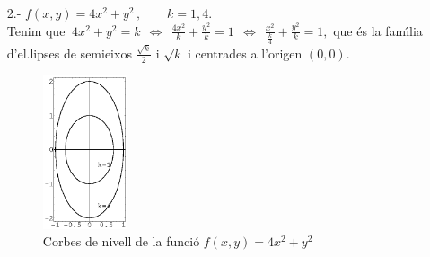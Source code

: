 \documentclass[12pt]{article}
\begin{document}
\begin{itemize}
%



\vspace*{0.3 cm}
  \item[2.-] $f(x,y)=4x^2+y^2\,,\qquad k=1,4$.\\

Tenim que $\
4x^2+y^2=k\,\; \Longleftrightarrow\,\; \frac{4x^2}{k} +
\frac{y^2}{k}=1\,\; \Longleftrightarrow\,\;
\frac{x^2}{\frac{k}{4}} + \frac{y^2}{k}=1,
  $
  que {\'e}s la fam{\'\i}lia d'el.lipses de semieixos $\frac{\sqrt{k}}{2}$ i
  $\sqrt{k}$ i centrades a l'origen $(0,0)$.

\begin{figure}[h!]
\begin{center}
\includegraphics[width=2.5cm]{Graf10.eps}
\vspace{-.6cm}
\end{center}\caption{Corbes de nivell de la funci{\'o}  $f(x,y)=4x^2+y^2$}
\end{figure}



\end{itemize}
\end{document}
